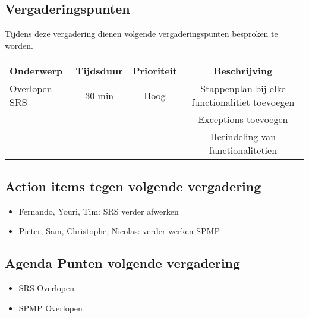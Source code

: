 \subsection{Vergaderingspunten}
Tijdens deze vergadering dienen volgende vergaderingspunten besproken te worden.
\begin{table} [H]
	\centering
	\begin{tabular} {l|c|c|c}
		Onderwerp & Tijdsduur & Prioriteit & Beschrijving \\ %
		\hline
		Overlopen SRS & 30 min & Hoog & Stappenplan bij elke functionalitiet toevoegen \\
		& & & Exceptions toevoegen \\
		& & & Herindeling van functionalitetien \\
										
	\end{tabular}
\end{table}
\subsection{Action items tegen volgende vergadering}
	\begin{itemize}
		\item Fernando, Youri, Tim: SRS verder afwerken
		\item Pieter, Sam, Christophe, Nicolas: verder  werken SPMP
	\end{itemize}
	
\subsection{Agenda Punten volgende vergadering}
	\begin{itemize}
		\item SRS Overlopen
		\item SPMP Overlopen
	\end{itemize}


